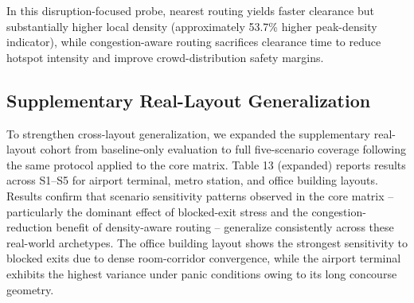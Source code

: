 \documentclass[nolineno]{ieeeaccess}
\begin{document}
In this disruption-focused probe, nearest routing yields faster clearance but substantially higher local density (approximately 53.7\% higher peak-density indicator), while congestion-aware routing sacrifices clearance time to reduce hotspot intensity and improve crowd-distribution safety margins.

\subsection{Supplementary Real-Layout Generalization}
To strengthen cross-layout generalization, we expanded the supplementary real-layout cohort from baseline-only evaluation to full five-scenario coverage following the same protocol applied to the core matrix. Table 13 (expanded) reports results across S1--S5 for airport terminal, metro station, and office building layouts. Results confirm that scenario sensitivity patterns observed in the core matrix -- particularly the dominant effect of blocked-exit stress and the congestion-reduction benefit of density-aware routing -- generalize consistently across these real-world archetypes. The office building layout shows the strongest sensitivity to blocked exits due to dense room-corridor convergence, while the airport terminal exhibits the highest variance under panic conditions owing to its long concourse geometry.
\end{document}

